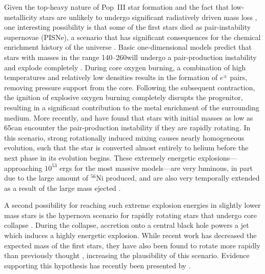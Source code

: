 \documentclass[../thesis.tex]{subfiles}
\begin{document}
Given the top-heavy nature of Pop~III star formation and the fact that
low-metallicity stars are unlikely to undergo significant radiatively
driven mass loss \citep{Kudritzki2002}, one interesting possibility is
that some of the first stars died as pair-instability supernovae
(PISNe), a scenario that has significant consequences for the chemical
enrichment history of the universe \citep{HegerWoosley2002,
  TumlinsonVenkatesanShull2004, KarlssonJohnsonBromm2008}.  Basic
one-dimensional models predict that stars with masses in the range
140--260\msun will undergo a pair-production instability and explode
completely \citep{BarkatRakavySack1967, Fraley1968}.  During core
oxygen burning, a combination of high temperatures and relatively low
densities results in the formation of $e^{\pm}$ pairs, removing
pressure support from the core. Following the subsequent contraction,
the ignition of explosive oxygen burning completely disrupts the
progenitor, resulting in a significant contribution to the metal
enrichment of the surrounding medium. More recently,
\citet{ChatzopoulosWheeler2012} and \citet{YoonDierksLanger2012} have
found that stars with initial masses as low as 65\msun can encounter
the pair-production instability if they are rapidly rotating.  In this
scenario, strong rotationally induced mixing causes nearly homogeneous
evolution, such that the star is converted almost entirely to helium
before the next phase in its evolution begins.  These extremely
energetic explosions---approaching $10^{53}$ ergs for the most massive
models---are very luminous, in part due to the large amount of $^{56}$Ni
produced, and are also very temporally extended as a result of the
large mass ejected \citep{FryerWoosleyHeger2001, HegerWoosley2002,
  Hegeretal2003, JoggerstWhalen2011, KasenWoosleyHeger2011}.

A second possibility for reaching such extreme explosion energies in
slightly lower mass stars is the hypernova scenario for rapidly
rotating stars that undergo core collapse \citep{UmedaNomoto2003,
  TominagaUmedaNomoto2007}.  During the collapse, accretion onto a
central black hole powers a jet which induces a highly energetic
explosion. While recent work has decreased the expected mass of the
first stars, they have also been found to rotate more rapidly than
previously thought \citep{StacyBrommLoeb2011b}, increasing the
plausibility of this scenario. Evidence supporting this hypothesis has
recently been presented by \citet{Chiappinietal2011}.
\end{document}
